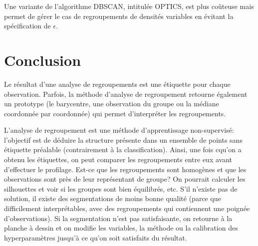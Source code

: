 \documentclass[
  11pt,
  letterpaper,
]{scrbook}
\theoremstyle{definition}
\theoremstyle{remark}
\begin{document}
Une variante de l'algorithme DBSCAN, intitulée OPTICS, est plus coûteuse
mais permet de gérer le cas de regroupements de densités variables en
évitant la spécification de \(\epsilon\).

\hypertarget{conclusion}{%
\section{Conclusion}\label{conclusion}}

Le résultat d'une analyse de regroupements est une étiquette pour chaque
observation. Parfois, la méthode d'analyse de regroupement retourne
également un prototype (le barycentre, une observation du groupe ou la
médiane coordonnée par coordonnée) qui permet d'interpréter les
regroupements.

L'analyse de regroupement est une méthode d'apprentissage non-supervisé:
l'objectif est de déduire la structure présente dans un ensemble de
points sans étiquette préalable (contrairement à la classification).
Ainsi, une fois cqu'on a obtenu les étiquettes, on peut comparer les
regroupements entre eux avant d'effectuer le profilage. Est-ce que les
regroupements sont homogènes et que les observations sont près de leur
représentant de groupe? On pourrait calculer les silhouettes et voir si
les groupes sont bien équilibrés, etc. S'il n'existe pas de solution, il
existe des segmentations de moins bonne qualité (parce que difficilement
interprétables, avec des regroupements qui contiennent une poignée
d'observations). Si la segmentation n'est pas satisfaisante, on retourne
à la planche à dessin et on modifie les variables, la méthode ou la
calibration des hyperparamètres jusqu'à ce qu'on soit satisfaits du
résultat.
\end{document}
